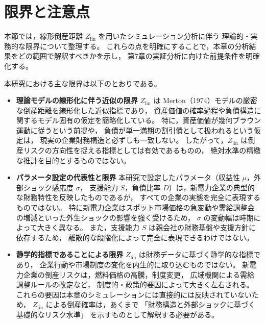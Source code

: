 
\section{限界と注意点}

本節では，線形倒産距離 $Z_{\text{lin}}$ を用いたシミュレーション分析に伴う
理論的・実務的な限界について整理する。
これらの点を明確にすることで，本章の分析結果をどの範囲で解釈すべきかを示し，
第7章の実証分析に向けた前提条件を明確化する。

本研究における主な限界は以下のとおりである。

\begin{itemize}
    \item \textbf{理論モデルの線形化に伴う近似の限界}  
    $Z_{\text{lin}}$ は Merton（1974）モデルの厳密な倒産距離を線形化した近似指標であり，
    資産価値の確率過程や負債構造に関するモデル固有の仮定を簡略化している。
    特に，資産価値が幾何ブラウン運動に従うという前提や，
    負債が単一満期の割引債として扱われるという仮定は，
    現実の企業財務構造と必ずしも一致しない。
    したがって，$Z_{\text{lin}}$ は倒産リスクの方向性を捉える指標としては有効であるものの，
    絶対水準の精緻な推計を目的とするものではない。

    \item \textbf{パラメータ設定の代表性と限界}  
    本研究で設定したパラメータ（収益性 $\mu$，外部ショック感応度 $\sigma$，
    支援能力 $S$，負債比率 $D$）は，新電力企業の典型的な財務特性を反映したものであるが，
    すべての企業の実態を完全に表現するものではない。
    特に新電力企業はスポット市場価格の急変動や需給調整金の増減といった外生ショックの影響を強く受けるため，
    $\sigma$ の変動幅は時期によって大きく異なる。
    また，支援能力 $S$ は親会社の財務基盤や支援方針に依存するため，
    離散的な段階化によって完全に表現できるわけではない。

    \item \textbf{静学的指標であることによる限界}  
    $Z_{\text{lin}}$ は財務データに基づく静学的な指標であり，
    企業行動や市場制度の変化を内生的に取り込むものではない。
    新電力企業の倒産リスクは，燃料価格の高騰，制度変更，
    広域機関による需給調整ルールの改定など，
    制度的・政策的要因によって大きく左右される。
    これらの要因は本章のシミュレーションには直接的には反映されていないため，
    $Z_{\text{lin}}$ による倒産確率は，あくまで
    「財務構造と外部ショックに基づく基礎的なリスク水準」
    を示すものとして解釈する必要がある。
\end{itemize}

